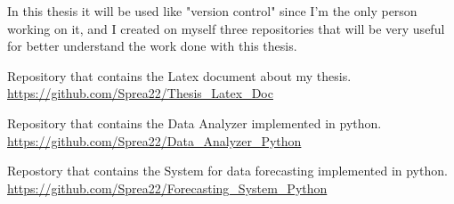 In this thesis it will be used like "version control" since I'm the only person working on it, and I created on myself three repositories that will be very useful for better understand the work done with this thesis.

Repository that contains the Latex document about my thesis.\\
\url{https://github.com/Sprea22/Thesis_Latex_Doc}

Repository that contains the Data Analyzer implemented in python.\\
\url{https://github.com/Sprea22/Data_Analyzer_Python}

Repostory that contains the System for data forecasting implemented in python.\\
\url{https://github.com/Sprea22/Forecasting_System_Python}
